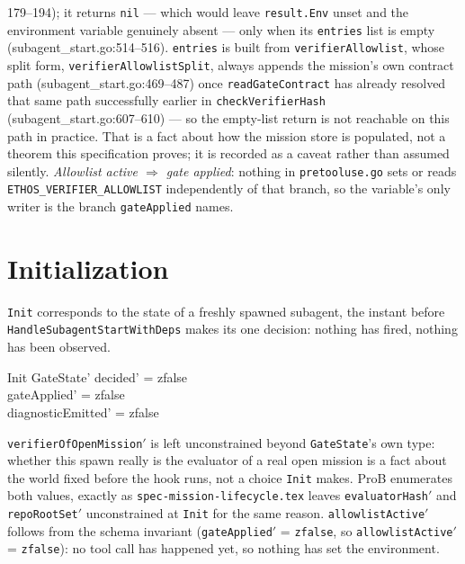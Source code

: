 \documentclass[a4paper,10pt,fleqn]{article}
\newcommand{\fpath}[1]{\texttt{#1}}
\newcommand{\field}[1]{\texttt{#1}}
\begin{document}
\begin{itemize}
    179--194); it returns \field{nil} --- which would leave
    \field{result.Env} unset and the environment variable genuinely
    absent --- only when its \field{entries} list is empty
    (subagent\_start.go:514--516). \field{entries} is built from
    \field{verifierAllowlist}, whose split form,
    \field{verifierAllowlistSplit}, always appends the mission's own
    contract path (subagent\_start.go:469--487) once
    \field{readGateContract} has already resolved that same path
    successfully earlier in \field{checkVerifierHash}
    (subagent\_start.go:607--610) --- so the empty-list return is not
    reachable on this path in practice. That is a fact about how the
    mission store is populated, not a theorem this specification
    proves; it is recorded as a caveat rather than assumed silently.
    \emph{Allowlist active $\Rightarrow$ gate applied}: nothing in
    \fpath{pretooluse.go} sets or reads
    \field{ETHOS\_VERIFIER\_ALLOWLIST} independently of that branch,
    so the variable's only writer is the branch \field{gateApplied}
    names.
\end{itemize}

\section{Initialization}
\label{sec:init}

\field{Init} corresponds to the state of a freshly spawned subagent,
the instant before \field{HandleSubagentStartWithDeps} makes its
one decision: nothing has fired, nothing has been observed.

\begin{schema}{Init}
GateState'
\where
decided' = zfalse \\
gateApplied' = zfalse \\
diagnosticEmitted' = zfalse
\end{schema}

\field{verifierOfOpenMission}$'$ is left unconstrained beyond
\field{GateState}'s own type: whether this spawn really is the
evaluator of a real open mission is a fact about the world fixed
before the hook runs, not a choice \field{Init} makes. ProB
enumerates both values, exactly as \fpath{spec-mission-lifecycle.tex}
leaves \field{evaluatorHash}$'$ and \field{repoRootSet}$'$
unconstrained at \field{Init} for the same reason.
\field{allowlistActive}$'$ follows from the schema invariant
(\field{gateApplied}$'$ = \field{zfalse}, so
\field{allowlistActive}$'$ = \field{zfalse}): no tool call has
happened yet, so nothing has set the environment.
\end{document}
